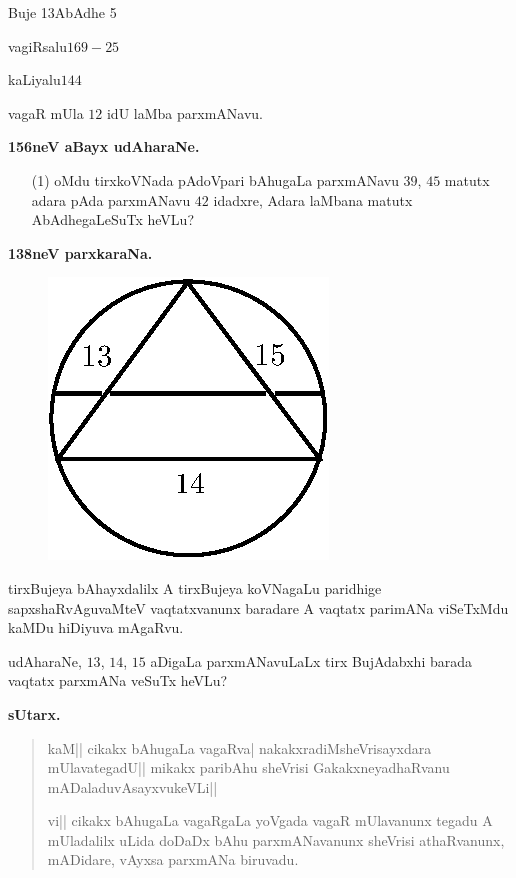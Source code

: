Buje 13\qquad AbAdhe 5

vagiRsalu\quad $169-25$

kaLiyalu\quad $144$

vagaR mUla $12$ idU laMba parxmANavu.


\medskip

\begin{center}
{\large\bf 156neV aBayx udAharaNe.}
\end{center}

\begin{itemize}
\item[\rm(1)] oMdu tirxkoVNada pAdoVpari bAhugaLa parxmANavu $39$,
$45$ matutx adara pAda parxmANavu $42$ idadxre, Adara laMbana matutx
AbAdhegaLeSuTx heVLu?
\end{itemize}


\vskip 1cm

\begin{center}
{\bf\LARGE 138neV parxkaraNa.}
\end{center}

\begin{figure}[H]
\centering
\includegraphics{figure/fig32.eps}
\end{figure}

tirxBujeya bAhayxdalilx A tirxBujeya koVNagaLu paridhige
sapxshaRvAguvaMteV vaqtatxvanunx baradare A vaqtatx parimANa viSeTxMdu
kaMDu hiDiyuva mAgaRvu.

udAharaNe, $13$, $14$, $15$ aDigaLa parxmANavuLaLx tirx BujAdabxhi
barada vaqtatx parxmANa veSuTx heVLu?

\medskip
\begin{center}
{\large\bf sUtarx.}
\end{center}

\begin{verse}
kaM|| cikakx bAhugaLa vagaRva| nakakxradiMsheVrisayxdara
mUlavategadU|| mikakx paribAhu sheVrisi Gakakxneya\-dhaRvanu
mADaladuvAsayxvukeVLi||

vi|| cikakx bAhugaLa vagaRgaLa yoVgada vagaR mUlavanunx tegadu A
mUladalilx uLida doDaDx bAhu parxmANavanunx sheVrisi athaRvanunx,
mADidare, vAyxsa parxmANa biruvadu.
\end{verse}

